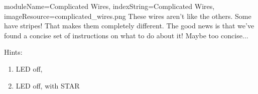 \documentclass{../../ktane-mod}
\begin{document}
\begin{module}{
  moduleName=Complicated Wires,
  indexString=Complicated Wires,
  imageResource=complicated_wires.png
}
{
  \sloppy
  These wires aren't like the others. Some have stripes! That makes them completely different. The good news is that we've found a concise set of instructions on what to do about it! Maybe too concise...
}

\newlength{\cellwidth}
\newlength{\cellheight}
\newlength{\cellheightwithoutpadding}
\setlength{\cellwidth}{1cm}
\setlength{\cellheight}{1.13cm}
\setlength{\cellheightwithoutpadding}{1cm}
\newlength{\lastcellwidth}
\setlength{\lastcellwidth}{2.1cm}
\newlength{\fivecellwidth}
\setlength{\fivecellwidth}{5.69cm}
\newlength{\twocellheight}
\setlength{\twocellheight}{2\cellheight}
\newlength{\circleoffset}
\setlength{\circleoffset}{0.20\cellwidth}
\newlength{\staroffset}
\setlength{\staroffset}{0.05\cellwidth}
\newlength{\tablelinewidth}
\setlength{\tablelinewidth}{1pt}

\begin{bulletlist}
\end{bulletlist}

Hints:
\begin{bulletlist}
\end{bulletlist}

\vspace{2cm}

\begin{minipage}[t]{0.48\textwidth}
\begin{enumerate}
  \renewcommand{\labelenumi}{\alph{enumi}.}
  \item LED off, 
  \item LED off, \RED with STAR
\end{enumerate}

\vspace{0.5cm}


\end{minipage}
\end{module}
\end{document}
